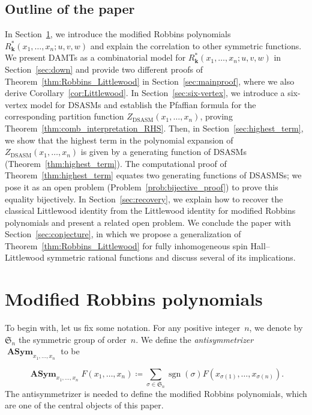 \documentclass[ALCO, Unicode]{cedram}
\newcommand{\deff}[1]{\emph{#1}}
\DeclareMathOperator{\sgn}{sgn}
\DeclareMathOperator{\asym}{\mathbf{ASym}}
\DeclareMathOperator{\DSASM}{DSASM}
\newcommand{\boldk}{\boldsymbol{k}}
\begin{document}
	\subsection*{Outline of the paper}
	In Section~\ref{sec:robbins}, we introduce the modified Robbins polynomials $R_{\boldk}^{\ast}(x_{1},\ldots,x_{n};u,v,w)$ and explain the correlation to other symmetric functions. We present DAMTs as a combinatorial model for $R_{\boldk}^{\ast}(x_{1},\ldots,x_{n};u,v,w)$ in Section~\ref{sec:down} and provide two different proofs of Theorem~\ref{thm:Robbins_Littlewood} in Section~\ref{sec:mainproof}, where we also derive Corollary~\ref{cor:Littlewood}. In Section~\ref{sec:six-vertex}, we introduce a six-vertex model for DSASMs and establish the Pfaffian formula for the corresponding partition function $Z_{\DSASM} (x_1,\dots,x_n)$, proving Theorem~\ref{thm:comb_interpretation_RHS}. Then, in Section~\ref{sec:highest_term}, we show that the highest term in the polynomial expansion of $Z_{\DSASM} (x_1,\dots,x_n)$ is given by a generating function of DSASMs (Theorem~\ref{thm:highest_term}). The computational proof of Theorem~\ref{thm:highest_term} equates two generating functions of DSASMSs; we pose it as an open problem (Problem~\ref{prob:bijective_proof}) to prove this equality bijectively. In Section~\ref{sec:recovery}, we explain how to recover the classical Littlewood identity from the Littlewood identity for modified Robbins polynomials and present a related open problem. We conclude the paper with Section~\ref{sec:conjecture}, in which we propose a generalization of Theorem~\ref{thm:Robbins_Littlewood} for fully inhomogeneous spin Hall--Littlewood symmetric rational functions and discuss several of its implications.
	
	\section{Modified Robbins polynomials}
	\label{sec:robbins}
	
	To begin with, let us fix some notation. For any positive integer~$n$, we denote by $\mathfrak{S}_{n}$ the symmetric group of order~$n$. We define the \deff{antisymmetrizer} $\asym_{x_1,\ldots,x_n}$ to be 
	
	\begin{equation*}
		\asym_{x_1,\ldots,x_n} F(x_{1},\ldots,x_{n}) \coloneqq \sum_{\sigma \in \mathfrak{S}_{n}}\sgn(\sigma) F(x_{\sigma(1)},\ldots,x_{\sigma(n)}).
	\end{equation*}
	The antisymmetrizer is needed to define the modified Robbins polynomials, which are one of the central objects of this paper.
	
\end{document}
